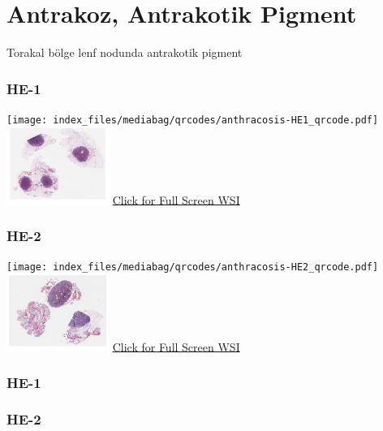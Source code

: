 \documentclass[
  letterpaper,
  DIV=11,
  numbers=noendperiod]{scrreprt}
\begin{document}
\hypertarget{sec-antrakoz-antrakotik-pigment}{%
\section{Antrakoz, Antrakotik
Pigment}\label{sec-antrakoz-antrakotik-pigment}}

Torakal bölge lenf nodunda antrakotik pigment

\hypertarget{he-1}{%
\subsubsection{HE-1}\label{he-1}}

\texttt{[image: index\_files/mediabag/qrcodes/anthracosis-HE1\_qrcode.pdf]}
\href{https://images.patolojiatlasi.com/anthracosis/HE.html}{\includegraphics[width=0.25\textwidth,height=\textheight]{./screenshots/thumbnail_anthracosis1.png}}
\href{https://images.patolojiatlasi.com/anthracosis/HE.html}{Click for
Full Screen WSI}

\hypertarget{he-2}{%
\subsubsection{HE-2}\label{he-2}}

\texttt{[image: index\_files/mediabag/qrcodes/anthracosis-HE2\_qrcode.pdf]}
\href{https://images.patolojiatlasi.com/anthracosis/HE2.html}{\includegraphics[width=0.25\textwidth,height=\textheight]{./screenshots/thumbnail_anthracosis2.png}}
\href{https://images.patolojiatlasi.com/anthracosis/HE2.html}{Click for
Full Screen WSI}

\hypertarget{he-1-1}{%
\subsubsection{HE-1}\label{he-1-1}}

\hypertarget{he-2-1}{%
\subsubsection{HE-2}\label{he-2-1}}
\end{document}
